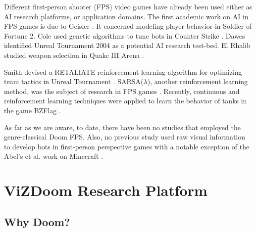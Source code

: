 \documentclass[english,american,conference, balance]{IEEEtran}
\begin{document}
\begin{comment}
First-person shorter games
\end{comment}
Different first-person shooter (FPS) video games have already been
used either as AI research platforms, or application domains. The
first academic work on AI in FPS games is due to Geisler \cite{geisler2002empirical}.
It concerned modeling player behavior in Soldier of Fortune 2. Cole
used genetic algorithms to tune bots in Counter Strike \cite{cole2004using}.
Dawes \cite{dawes2005towards} identified Unreal Tournament 2004 as
a potential AI research test-bed. El Rhalib studied weapon selection
in Quake III Arena \cite{el2007hybrid}. \begin{comment}
Reinforcement learning in FPS
\end{comment}
Smith devised a RETALIATE reinforcement learning algorithm for optimizing
team tactics in Unreal Tournament \cite{smith2007retaliate}. SARSA($\lambda$),
another reinforcement learning method, was the subject of research
in FPS games \cite{5672586,6314567}. Recently, continuous and reinforcement
learning techniques were applied to learn the behavior of tanks in
the game BZFlag \cite{smith2014continuous}.

As far as we are aware, to date, there have been no studies that employed
the genre-classical Doom FPS. Also, no previous study used raw visual
information to develop bots in first-person perspective games with
a notable exception of the Abel's et al. work on Minecraft \cite{DBLP:journals/corr/AbelADKS16}.


\section{ViZDoom Research Platform\label{sec:Platform}}

\subsection{Why Doom?}
\end{document}
